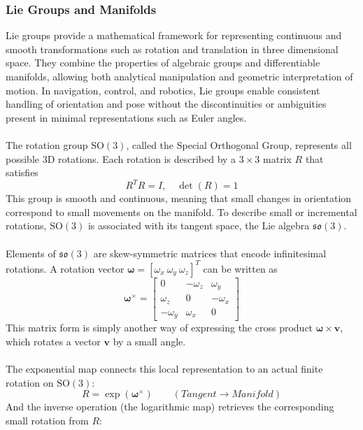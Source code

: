 \subsubsection{Lie Groups and Manifolds}
Lie groups provide a mathematical framework for representing continuous and smooth transformations such as rotation and translation in three dimensional space. They combine the properties of algebraic groups and differentiable manifolds, allowing both analytical manipulation and geometric interpretation of motion. In navigation, control, and robotics, Lie groups enable consistent handling of orientation and pose without the discontinuities or ambiguities present in minimal representations such as Euler angles.  
\\ \\
The rotation group $\mathrm{SO}(3)$, called the Special Orthogonal Group, represents all possible 3D rotations. Each rotation is described by a $3\times3$ matrix $R$ that satisfies
$$
    R^T R = I, \quad \det(R) = 1
$$
This group is smooth and continuous, meaning that small changes in orientation correspond to small movements on the manifold. To describe small or incremental rotations, $\mathrm{SO}(3)$ is associated with its tangent space, the Lie algebra $\mathfrak{so}(3)$.  
\\ \\
Elements of $\mathfrak{so}(3)$ are skew-symmetric matrices that encode infinitesimal rotations. A rotation vector $\boldsymbol{\omega} = [\omega_x~\omega_y~\omega_z]^T$ can be written as
$$
    \boldsymbol{\omega}^\times =
    \begin{bmatrix}
        0 & -\omega_z & \omega_y \\
        \omega_z & 0 & -\omega_x \\
        -\omega_y & \omega_x & 0
    \end{bmatrix}
$$
This matrix form is simply another way of expressing the cross product $\boldsymbol{\omega} \times \mathbf{v}$, which rotates a vector $\mathbf{v}$ by a small angle.  
\\ \\
The exponential map connects this local representation to an actual finite rotation on $\mathrm{SO}(3)$:
\begin{equation}
    R = \exp(\boldsymbol{\omega}^\times) \qquad (Tangent \rightarrow Manifold)
    \label{eq:lie-groups-and-manifold-exponential}
\end{equation}
And the inverse operation (the logarithmic map) retrieves the corresponding small rotation from $R$:

